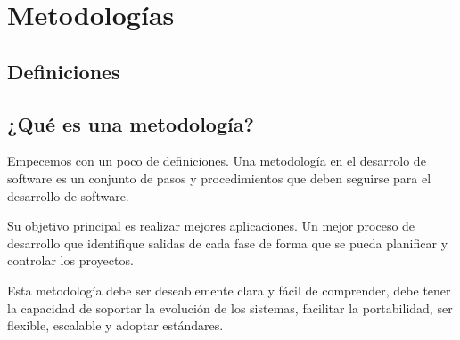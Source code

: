 \documentclass[12pt, fleqn]{report}                             %
\theoremstyle{break}                                            %
\begin{document}
\restoregeometry                                                    %
\nopagecolor                                                        %




\tableofcontents{}
\label{sec:Index}

\clearpage



\chapter{Metodologías}

\clearpage
\section{Definiciones}


	\section{¿Qué es una metodología?}
	
	Empecemos con un poco de definiciones. Una metodología en el desarrolo de software es un conjunto de pasos y procedimientos que deben seguirse para el desarrollo de software.
	
	
	Su objetivo principal es realizar mejores aplicaciones. Un mejor proceso de desarrollo que identifique salidas de cada fase de forma que se pueda planificar y controlar los proyectos.
	
	Esta metodología debe ser deseablemente clara y fácil de comprender, debe tener la capacidad de soportar la evolución de los sistemas, facilitar la portabilidad, ser flexible, escalable y adoptar estándares.
\end{document}
